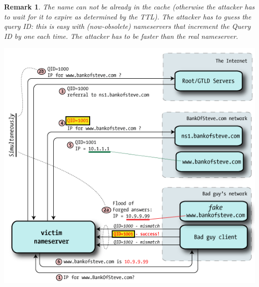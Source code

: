 \documentclass[10pt,a4paper]{book}
\newtheorem{remark}{Remark}
\begin{document}
\begin{remark}
The name can not be already in the cache (otherwise the attacker has to wait for it to expire as determined by the TTL). The attacker has to guess the query ID: this is easy with (now-obsolete) nameservers that increment the Query ID by one each time. The attacker has to be faster than the real nameserver.
\end{remark}
\includegraphics[scale=0.7]{img/cache-poisoning.png}
\end{document}
